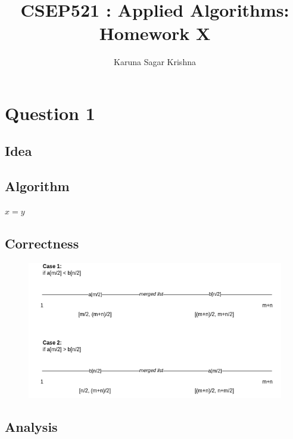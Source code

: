 \documentclass{article}
\title{CSEP521 : Applied Algorithms: Homework X}
\author{Karuna Sagar Krishna}
\begin{document}
    \maketitle

    \section*{Question 1}

    \subsection*{Idea}
    
    \subsection*{Algorithm}
        \begin{algorithm}[H]
            \begin{algorithmic}
                    \State $x = y$
                \EndProcedure
            \end{algorithmic}
        \end{algorithm}

    \subsection*{Correctness}
        \begin{figure}[H]
            \includegraphics[width=1\textwidth]{findkth.png}
        \end{figure}

    \subsection*{Analysis}
\end{document}
